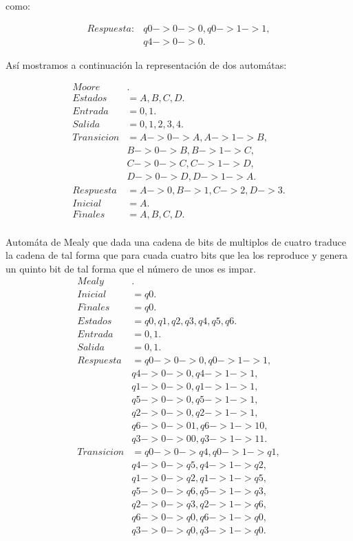 \documentclass[11pt,letterpaper]{article}
\begin{document}
\begin{multicols}{2}
  como:

  \begin{align*}
    Respuesta: &q0->0->0, q0->1->1, \\
    & q4->0->0.    
  \end{align*}

  Así mostramos a continuación la representación de dos automátas:

  
  \begin{align*}
    Moore&.\\
    Estados &= A,B,C,D.\\
    Entrada &= 0,1.\\
    Salida &= 0,1,2,3,4.\\
    Transicion &= A->0->A, A->1->B, \\
    &B->0->B, B->1->C,\\
    &C->0->C, C->1->D, \\
    &D->0->D, D->1->A.\\
    Respuesta &= A->0, B->1, C->2, D->3.\\
    Inicial &= A.\\
    Finales &= A,B,C,D.\\  
  \end{align*}

  Automáta de Mealy que dada una cadena de bits de multiplos de cuatro
  traduce la cadena de tal forma que para cuada cuatro bits que lea
  los reproduce y genera un quinto bit de tal forma que el número de unos es impar. 
  \begin{align*}
    Mealy&.\\
    Inicial    &= q0.\\
    Finales    &= q0.\\
    Estados    &= q0, q1, q2, q3, q4, q5, q6.\\
    Entrada    &= 0, 1.\\
    Salida     &= 0, 1.\\
    Respuesta &= q0->0->0, q0->1->1,\\
    &q4->0->0, q4->1->1,\\
    &q1->0->0, q1->1->1, \\
    &q5->0->0, q5->1->1,\\
    &q2->0->0, q2->1->1, \\
    &q6->0->01, q6->1->10,\\
    &q3->0->00, q3->1->11.\\
    Transicion  &= q0->0->q4, q0->1->q1,\\
    & q4->0->q5, q4->1->q2,\\
    &q1->0->q2, q1->1->q5,\\
    &q5->0->q6, q5->1->q3,\\
    &q2->0->q3, q2->1->q6,\\
    &q6->0->q0, q6->1->q0,\\
    &q3->0->q0, q3->1->q0.\\  
  \end{align*}
  

\end{multicols}
\end{document}
